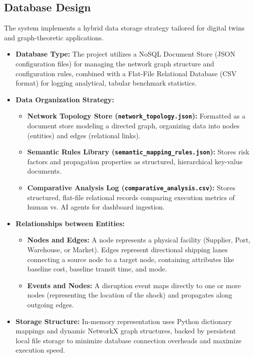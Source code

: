 \subsection[Database Design]{Database Design}
The system implements a hybrid data storage strategy tailored for digital twins and graph-theoretic applications.

\begin{itemize}
    \item \textbf{Database Type:} The project utilizes a NoSQL Document Store (JSON configuration files) for managing the network graph structure and configuration rules, combined with a Flat-File Relational Database (CSV format) for logging analytical, tabular benchmark statistics.
    \item \textbf{Data Organization Strategy:}
    \begin{itemize}
        \item \textbf{Network Topology Store (\texttt{network\_topology.json}):} Formatted as a document store modeling a directed graph, organizing data into nodes (entities) and edges (relational links).
        \item \textbf{Semantic Rules Library (\texttt{semantic\_mapping\_rules.json}):} Stores risk factors and propagation properties as structured, hierarchical key-value documents.
        \item \textbf{Comparative Analysis Log (\texttt{comparative\_analysis.csv}):} Stores structured, flat-file relational records comparing execution metrics of human vs. AI agents for dashboard ingestion.
    \end{itemize}
    \item \textbf{Relationships between Entities:}
    \begin{itemize}
        \item \textbf{Nodes and Edges:} A node represents a physical facility (Supplier, Port, Warehouse, or Market). Edges represent directional shipping lanes connecting a source node to a target node, containing attributes like baseline cost, baseline transit time, and mode.
        \item \textbf{Events and Nodes:} A disruption event maps directly to one or more nodes (representing the location of the shock) and propagates along outgoing edges.
    \end{itemize}
    \item \textbf{Storage Structure:} In-memory representation uses Python dictionary mappings and dynamic NetworkX graph structures, backed by persistent local file storage to minimize database connection overheads and maximize execution speed.
\end{itemize}

